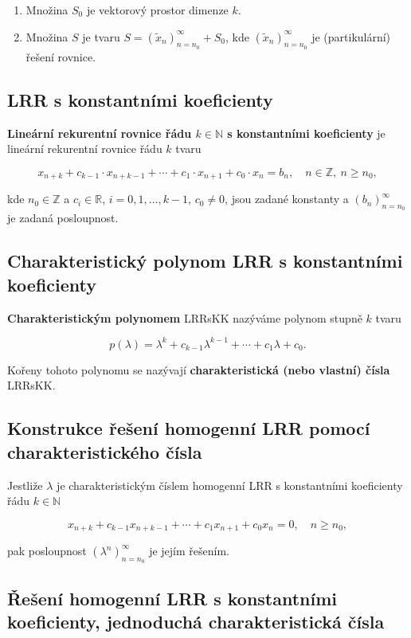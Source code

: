 \begin{enumerate}
    \item Množina $S_0$ je vektorový prostor dimenze $k$.
    \item Množina $S$ je tvaru $S = (\tilde{x}_n)_{n=n_0}^\infty + S_0$, kde
          $(\tilde{x}_n)_{n=n_0}^\infty$ je (partikulární) řešení rovnice.
\end{enumerate}

\subsection*{LRR s konstantními koeficienty}

\textbf{Lineární rekurentní rovnice řádu $k \in \mathbb{N}$ s konstantními koeficienty} je lineární rekurentní rovnice řádu $k$ tvaru

\[ x_{n+k} + c_{k-1} \cdot x_{n+k-1} + \cdots + c_{1} \cdot x_{n+1} + c_{0} \cdot x_n = b_n, \quad n \in \mathbb{Z}, \ n \geq n_0, \]

\noindent kde $n_0 \in \mathbb{Z}$ a $c_{i} \in \mathbb{R}$, $i = 0,1,\ldots,k-1$, $c_0 \neq 0$, jsou zadané konstanty a $(b_n)_{n=n_0}^\infty$ je zadaná posloupnost.

\subsection*{Charakteristický polynom LRR s konstantními koeficienty}

\textbf{Charakteristickým polynomem} LRRsKK nazýváme polynom stupně $k$ tvaru

\[ p(\lambda) = \lambda^k + c_{k-1} \lambda^{k - 1} + \cdots + c_1 \lambda + c_0. \]

\noindent Kořeny tohoto polynomu se nazývají \textbf{charakteristická (nebo vlastní) čísla} LRRsKK.

\subsection*{Konstrukce řešení homogenní LRR pomocí charakteristického čísla}

Jestliže $\lambda$ je charakteristickým číslem homogenní LRR s konstantními
koeficienty řádu $k\in\mathbb{N}$

\[ x_{n+k} + c_{k-1} x_{n+k-1} + \cdots + c_1 x_{n+1} + c_0 x_{n} = 0, \quad n \geq n_0, \]

\noindent pak posloupnost $(\lambda^n)_{n=n_0}^\infty$ je jejím řešením.

\subsection*{Řešení homogenní LRR s konstantními koeficienty, jednoduchá charakteristická čísla}

